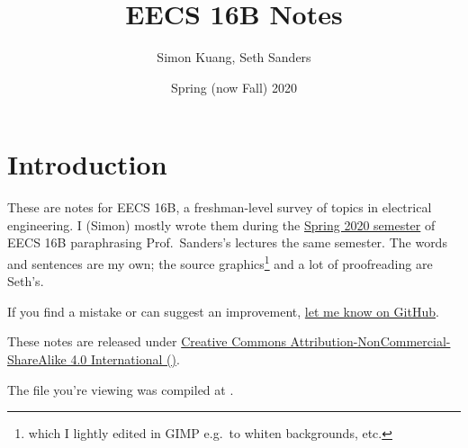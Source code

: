 \documentclass{../content16b}
\begin{document}
\title{EECS 16B Notes}
\author{Simon Kuang, Seth Sanders}
\date{Spring (now Fall) 2020}
\frontmatter
\maketitle

\section{Introduction}
These are notes for EECS 16B, a freshman-level survey of topics in electrical engineering. I (Simon) mostly wrote them during the \href{https://inst.eecs.berkeley.edu/~ee16b/sp20/}{Spring 2020 semester} of EECS 16B paraphrasing Prof.~Sanders's lectures the same semester.
The words and sentences are my own; the source graphics\footnote{which I lightly edited in GIMP e.g.~to whiten backgrounds, etc.} and a lot of proofreading are Seth's.

If you find a mistake or can suggest an improvement, \href{https://github.com/simontheflutist/eecs16b-notes}{let me know on GitHub}.

These notes are released under \href{https://creativecommons.org/licenses/by-nc-sa/4.0/}{Creative Commons Attribution-NonCommercial-ShareAlike 4.0 International (\ccbyncsa)}.

The file you're viewing was compiled at \DTMnow.

\newpage
\tableofcontents
\newpage
\listoffigures

\mainmatter
\renewcommand{\printchaptername}{\chapnamefont Lecture}










\end{document}
